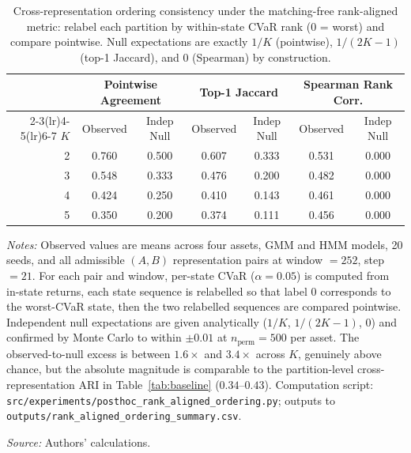 \documentclass[preprint,12pt,authoryear]{elsarticle}
\begin{document}
\begin{table}[!htbp]
\centering
\small
\setlength{\tabcolsep}{4.5pt}
\caption{Cross-representation ordering consistency under the matching-free rank-aligned metric: relabel each partition by within-state CVaR rank (0 = worst) and compare pointwise. Null expectations are exactly $1/K$ (pointwise), $1/(2K-1)$ (top-1 Jaccard), and $0$ (Spearman) by construction.}
\label{tab:ordering_rank_aligned}
\begin{tabular}{rcccccc}
\toprule
 & \multicolumn{2}{c}{Pointwise Agreement} & \multicolumn{2}{c}{Top-1 Jaccard} & \multicolumn{2}{c}{Spearman Rank Corr.} \\
\cmidrule(lr){2-3}\cmidrule(lr){4-5}\cmidrule(lr){6-7}
$K$ & Observed & Indep Null & Observed & Indep Null & Observed & Indep Null \\
\midrule
2 & 0.760 & 0.500 & 0.607 & 0.333 & 0.531 & 0.000 \\
3 & 0.548 & 0.333 & 0.476 & 0.200 & 0.482 & 0.000 \\
4 & 0.424 & 0.250 & 0.410 & 0.143 & 0.461 & 0.000 \\
5 & 0.350 & 0.200 & 0.374 & 0.111 & 0.456 & 0.000 \\
\bottomrule
\end{tabular}
\par\medskip
\begin{minipage}{\linewidth}
\footnotesize
\textit{Notes:} Observed values are means across four assets, GMM and HMM models, 20 seeds, and all admissible $(A, B)$ representation pairs at window $=252$, step $=21$. For each pair and window, per-state CVaR ($\alpha=0.05$) is computed from in-state returns, each state sequence is relabelled so that label 0 corresponds to the worst-CVaR state, then the two relabelled sequences are compared pointwise. Independent null expectations are given analytically ($1/K$, $1/(2K-1)$, $0$) and confirmed by Monte Carlo to within $\pm 0.01$ at $n_\text{perm}=500$ per asset. The observed-to-null excess is between $1.6\times$ and $3.4\times$ across $K$, genuinely above chance, but the absolute magnitude is comparable to the partition-level cross-representation ARI in Table~\ref{tab:baseline} ($0.34$--$0.43$). Computation script: \texttt{src/experiments/posthoc\_rank\_aligned\_ordering.py}; outputs to \texttt{outputs/rank\_aligned\_ordering\_summary.csv}.

\textit{Source:} Authors' calculations.
\end{minipage}
\end{table}
\end{document}

